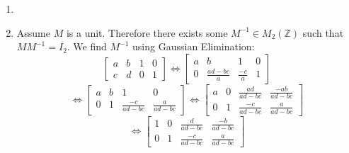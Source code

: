 \documentclass{article}
\begin{document}
\begin{enumerate}
\item

\item Assume $M$ is a unit.  Therefore there exists some $M^{-1} \in M_2(\mathbb{Z})$
such that $MM^{-1} = I_2$.  We find $M^{-1}$ using Gaussian Elimination:
\[
\left[
\begin{array}{cc|cc}
a & b & 1 & 0 \\
c & d & 0 & 1
\end{array}
\right]
\Leftrightarrow
\left[
\begin{array}{cc|cc}
a & b & 1 & 0 \\
0 & \frac{ad-bc}{a} & \frac{-c}{a} & 1
\end{array}
\right]
\]
\[
\Leftrightarrow
\left[
\begin{array}{cc|cc}
a & b & 1 & 0 \\
0 & 1 & \frac{-c}{ad-bc} & \frac{a}{ad-bc}
\end{array}
\right]
\Leftrightarrow
\left[
\begin{array}{cc|cc}
a & 0 & \frac{ad}{ad-bc} & \frac{-ab}{ad-bc} \\
0 & 1 & \frac{-c}{ad-bc} & \frac{a}{ad-bc}
\end{array}
\right]
\]
\[
\Leftrightarrow
\left[
\begin{array}{cc|cc}
1 & 0 & \frac{d}{ad-bc} & \frac{-b}{ad-bc} \\
0 & 1 & \frac{-c}{ad-bc} & \frac{a}{ad-bc}
\end{array}
\right]
\]


\end{enumerate}
\end{document}

